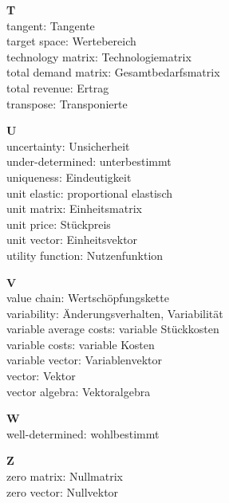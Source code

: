 \medskip
\noindent
{\bf T}\\
tangent: Tangente\\
target space: Wertebereich\\
technology matrix: Technologiematrix\\
total demand matrix: Gesamtbedarfsmatrix\\
total revenue: Ertrag\\
transpose: Transponierte

\medskip
\noindent
{\bf U}\\
uncertainty: Unsicherheit\\
under-determined: unterbestimmt\\
uniqueness: Eindeutigkeit\\
unit elastic: proportional elastisch\\
unit matrix: Einheitsmatrix\\
unit price: St\"uckpreis\\
unit vector: Einheitsvektor\\
utility function: Nutzenfunktion

\medskip
\noindent
{\bf V}\\
value chain: Wertsch\"{o}pfungskette\\
variability: \"Anderungsverhalten, Variabilit\"at\\
variable average costs: variable St\"uckkosten\\
variable costs: variable Kosten\\
variable vector: Variablenvektor\\
vector: Vektor\\
vector algebra: Vektoralgebra

\medskip
\noindent
{\bf W}\\
well-determined: wohlbestimmt

\medskip
\noindent
{\bf Z}\\
zero matrix: Nullmatrix\\
zero vector: Nullvektor


